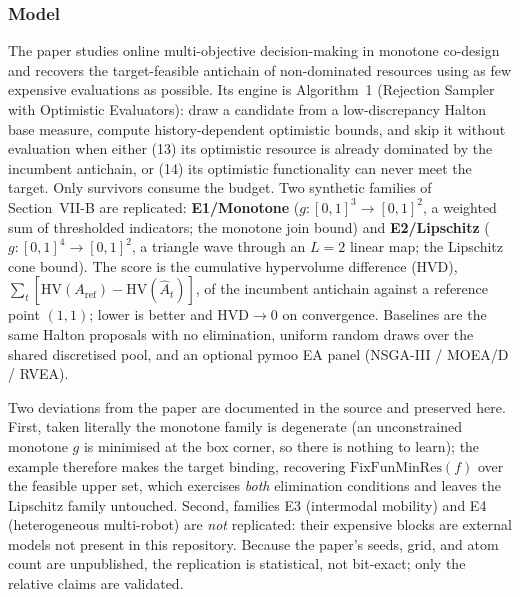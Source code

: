 \documentclass[11pt,a4paper]{article}
\begin{document}
\subsubsection*{Model}
The paper studies online multi-objective decision-making in monotone
co-design and recovers the target-feasible antichain of non-dominated
resources using as few expensive evaluations as possible. Its engine is
Algorithm~1 (Rejection Sampler with Optimistic Evaluators): draw a
candidate from a low-discrepancy Halton base measure, compute
history-dependent optimistic bounds, and skip it without evaluation when
either (13) its optimistic resource is already dominated by the incumbent
antichain, or (14) its optimistic functionality can never meet the target.
Only survivors consume the budget. Two synthetic families of
Section~VII-B are replicated: \textbf{E1/Monotone}
($g:[0,1]^3\!\to\![0,1]^2$, a weighted sum of thresholded indicators; the
monotone join bound) and \textbf{E2/Lipschitz} ($g:[0,1]^4\!\to\![0,1]^2$,
a triangle wave through an $L{=}2$ linear map; the Lipschitz cone bound).
The score is the cumulative hypervolume difference (HVD),
$\sum_t [\mathrm{HV}(A_{\mathrm{ref}}) - \mathrm{HV}(\hat A_t)]$, of the
incumbent antichain against a reference point $(1,1)$; lower is better and
HVD${}\to 0$ on convergence. Baselines are the same Halton proposals with
no elimination, uniform random draws over the shared discretised pool,
and an optional pymoo EA panel (NSGA-III / MOEA/D / RVEA).

Two deviations from the paper are documented in the source and preserved
here. First, taken literally the monotone family is degenerate (an
unconstrained monotone $g$ is minimised at the box corner, so there is
nothing to learn); the example therefore makes the target binding,
recovering $\mathrm{FixFunMinRes}(f)$ over the feasible upper set, which
exercises \emph{both} elimination conditions and leaves the Lipschitz
family untouched. Second, families E3 (intermodal mobility) and E4
(heterogeneous multi-robot) are \emph{not} replicated: their expensive
blocks are external models not present in this repository. Because the
paper's seeds, grid, and atom count are unpublished, the replication is
statistical, not bit-exact; only the relative claims are validated.
\end{document}

